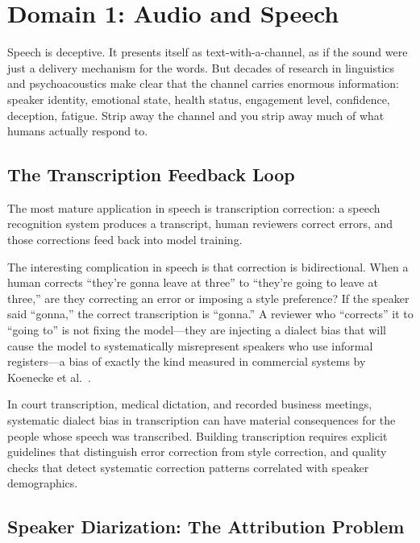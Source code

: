 \section{Domain 1: Audio and Speech}
\label{sec:audio-speech}

Speech is deceptive. It presents itself as text-with-a-channel, as if the sound were just a delivery mechanism for the words. But decades of research in linguistics and psychoacoustics make clear that the channel carries enormous information: speaker identity, emotional state, health status, engagement level, confidence, deception, fatigue. Strip away the channel and you strip away much of what humans actually respond to.

\subsection{The Transcription Feedback Loop}

The most mature \hitl application in speech is transcription correction: a speech recognition system produces a transcript, human reviewers correct errors, and those corrections feed back into model training.

The interesting complication in speech is that correction is bidirectional. When a human corrects ``they're gonna leave at three'' to ``they're going to leave at three,'' are they correcting an error or imposing a style preference? If the speaker said ``gonna,'' the correct transcription is ``gonna.'' A reviewer who ``corrects'' it to ``going to'' is not fixing the model---they are injecting a dialect bias that will cause the model to systematically misrepresent speakers who use informal registers---a bias of exactly the kind measured in commercial systems by Koenecke et al.\ \autocite{koenecke2020racial}.

\begin{cautionbox}
In court transcription, medical dictation, and recorded business meetings, systematic dialect bias in transcription can have material consequences for the people whose speech was transcribed. Building transcription \hitl requires explicit guidelines that distinguish error correction from style correction, and quality checks that detect systematic correction patterns correlated with speaker demographics.
\end{cautionbox}

\subsection{Speaker Diarization: The Attribution Problem}


